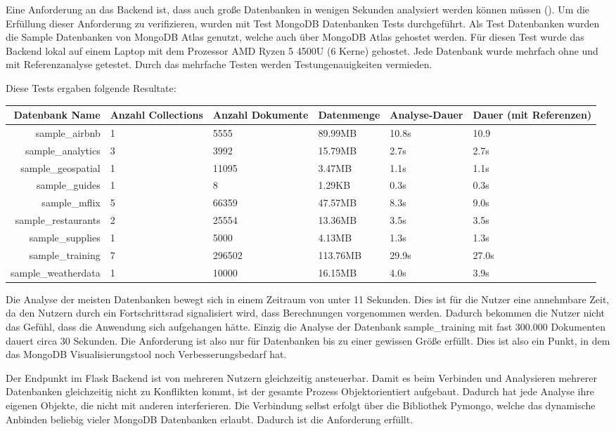 Eine Anforderung an das Backend ist, dass auch große Datenbanken in wenigen Sekunden analysiert werden können müssen ().
Um die Erfüllung dieser Anforderung zu verifizieren, wurden mit Test MongoDB Datenbanken Tests durchgeführt.
Als Test Datenbanken wurden die Sample Datenbanken von MongoDB Atlas genutzt, welche auch über MongoDB Atlas gehostet werden.
Für diesen Test wurde das Backend lokal auf einem Laptop mit dem Prozessor AMD Ryzen 5 4500U (6 Kerne) gehostet.
Jede Datenbank wurde mehrfach ohne und mit Referenzanalyse getestet.
Durch das mehrfache Testen werden Testungenauigkeiten vermieden.

Diese Tests ergaben folgende Resultate:

\begin{tabular}{ |r|m{2cm}|m{2cm}|m{2cm}|m{2cm}|m{2cm}| }
        \hline
        \textbf{Datenbank Name} & \textbf{Anzahl Collections} & \textbf{Anzahl Dokumente} & \textbf{Datenmenge} & \textbf{Analyse-Dauer} & \textbf{Dauer (mit Referenzen)}\\
        \hline
        sample\_airbnb & 1 & 5555 & 89.99MB & 10.8s & 10.9\\
        sample\_analytics & 3 & 3992 & 15.79MB & 2.7s & 2.7s\\
        sample\_geospatial & 1 & 11095 & 3.47MB & 1.1s & 1.1s\\
        sample\_guides & 1 & 8 & 1.29KB & 0.3s & 0.3s\\
        sample\_mflix & 5 & 66359 & 47.57MB & 8.3s & 9.0s\\
        sample\_restaurants & 2 & 25554 & 13.36MB & 3.5s & 3.5s\\
        sample\_supplies & 1 & 5000 & 4.13MB & 1.3s & 1.3s\\
        sample\_training & 7 & 296502 & 113.76MB & 29.9s & 27.0s\\
        sample\_weatherdata & 1 & 10000 & 16.15MB & 4.0s & 3.9s\\
        \hline
\end{tabular}

Die Analyse der meisten Datenbanken bewegt sich in einem Zeitraum von unter 11 Sekunden.
Dies ist für die Nutzer eine annehmbare Zeit, da den Nutzern durch ein Fortschrittsrad signalisiert wird, dass Berechnungen vorgenommen werden.
Dadurch bekommen die Nutzer nicht das Gefühl, dass die Anwendung sich aufgehangen hätte.
Einzig die Analyse der Datenbank sample\_training mit fast 300.000 Dokumenten dauert circa 30 Sekunden.
Die Anforderung  ist also  nur für Datenbanken bis zu einer gewissen Größe erfüllt.
Dies ist also ein Punkt, in dem das MongoDB Visualisierungstool noch Verbesserungsbedarf hat.

Der Endpunkt im Flask Backend ist von mehreren Nutzern gleichzeitig ansteuerbar.
Damit es beim Verbinden und Analysieren mehrerer Datenbanken gleichzeitig nicht zu Konflikten kommt, ist der gesamte Prozess Objektorientiert aufgebaut.
Dadurch hat jede Analyse ihre eigenen Objekte, die nicht mit anderen interferieren.
Die Verbindung selbst erfolgt über die Bibliothek Pymongo, welche das dynamische Anbinden beliebig vieler MongoDB Datenbanken erlaubt.
Dadurch ist die Anforderung  erfüllt.
